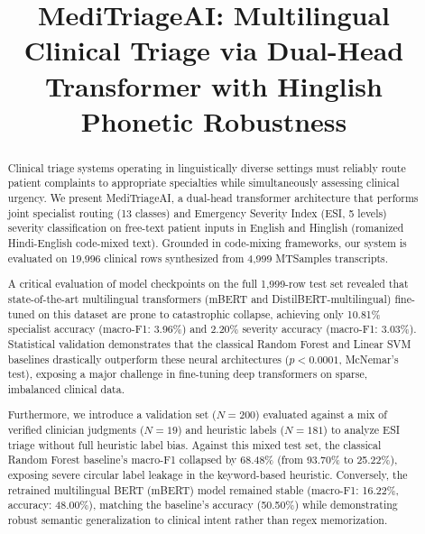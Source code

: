 \documentclass[10pt,conference]{IEEEtran}
\begin{document}
\title{MediTriageAI: Multilingual Clinical Triage via Dual-Head Transformer with Hinglish Phonetic Robustness}

\author{
}

\maketitle

\begin{abstract}
Clinical triage systems operating in linguistically diverse settings must reliably route patient complaints to appropriate specialties while simultaneously assessing clinical urgency. We present MediTriageAI, a dual-head transformer architecture that performs joint specialist routing (13 classes) and Emergency Severity Index (ESI, 5 levels) severity classification on free-text patient inputs in English and Hinglish (romanized Hindi-English code-mixed text). Grounded in code-mixing frameworks, our system is evaluated on 19,996 clinical rows synthesized from 4,999 MTSamples transcripts. 

A critical evaluation of model checkpoints on the full 1,999-row test set revealed that state-of-the-art multilingual transformers (mBERT and DistilBERT-multilingual) fine-tuned on this dataset are prone to catastrophic collapse, achieving only 10.81\% specialist accuracy (macro-F1: 3.96\%) and 2.20\% severity accuracy (macro-F1: 3.03\%). Statistical validation demonstrates that the classical Random Forest and Linear SVM baselines drastically outperform these neural architectures ($p < 0.0001$, McNemar's test), exposing a major challenge in fine-tuning deep transformers on sparse, imbalanced clinical data.

Furthermore, we introduce a validation set ($N=200$) evaluated against a mix of verified clinician judgments ($N=19$) and heuristic labels ($N=181$) to analyze ESI triage without full heuristic label bias. Against this mixed test set, the classical Random Forest baseline's macro-F1 collapsed by 68.48\% (from 93.70\% to 25.22\%), exposing severe circular label leakage in the keyword-based heuristic. Conversely, the retrained multilingual BERT (mBERT) model remained stable (macro-F1: 16.22\%, accuracy: 48.00\%), matching the baseline's accuracy (50.50\%) while demonstrating robust semantic generalization to clinical intent rather than regex memorization.
\end{abstract}
\end{document}
